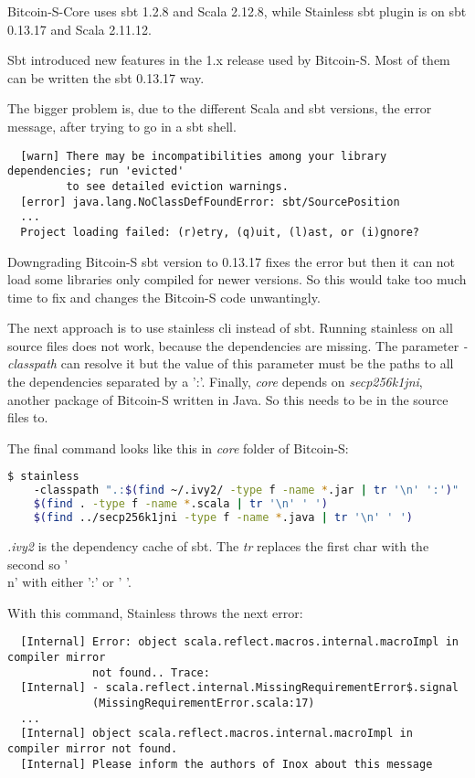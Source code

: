 Bitcoin-S-Core uses sbt 1.2.8 and Scala 2.12.8, while Stainless sbt plugin is on sbt 0.13.17 and Scala 2.11.12.

Sbt introduced new features in the 1.x release used by Bitcoin-S.
Most of them can be written the sbt 0.13.17 way.

The bigger problem is, due to the different Scala and sbt versions, the error message, after trying to go in a sbt shell.
\begin{verbatim}
  [warn] There may be incompatibilities among your library dependencies; run 'evicted'
         to see detailed eviction warnings.
  [error] java.lang.NoClassDefFoundError: sbt/SourcePosition
  ...
  Project loading failed: (r)etry, (q)uit, (l)ast, or (i)gnore?
\end{verbatim}

Downgrading Bitcoin-S sbt version to 0.13.17 fixes the error but then it can not load some libraries only compiled for newer versions.
So this would take too much time to fix and changes the Bitcoin-S code unwantingly.

The next approach is to use stainless cli instead of sbt.
Running stainless on all source files does not work, because the dependencies are missing.
The parameter \emph{-classpath} can resolve it but the value of this parameter must be the paths to all the dependencies separated by a ':'.
Finally, \emph{core} depends on \emph{secp256k1jni}, another package of Bitcoin-S written in Java.
So this needs to be in the source files to.

The final command looks like this in \emph{core} folder of Bitcoin-S:
\begin{lstlisting}[language=bash]
  $ stainless
    -classpath ".:$(find ~/.ivy2/ -type f -name *.jar | tr '\n' ':')"
    $(find . -type f -name *.scala | tr '\n' ' ')
    $(find ../secp256k1jni -type f -name *.java | tr '\n' ' ')
\end{lstlisting}

\emph{.ivy2} is the dependency cache of sbt.
The \emph{tr} replaces the first char with the second so '\\n' with either ':' or ' '.

With this command, Stainless throws the next error:
\begin{verbatim}
  [Internal] Error: object scala.reflect.macros.internal.macroImpl in compiler mirror
             not found.. Trace:
  [Internal] - scala.reflect.internal.MissingRequirementError$.signal
             (MissingRequirementError.scala:17)
  ...
  [Internal] object scala.reflect.macros.internal.macroImpl in compiler mirror not found.
  [Internal] Please inform the authors of Inox about this message
\end{verbatim}

